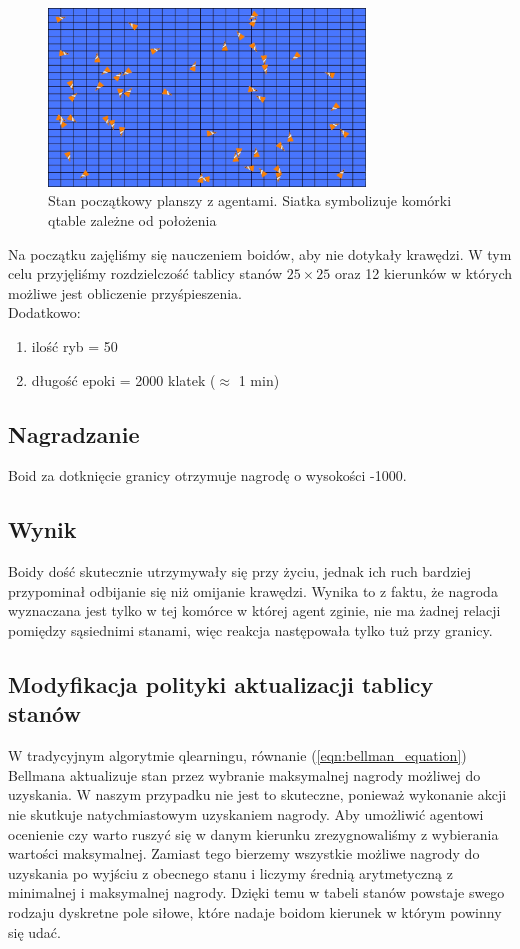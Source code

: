 \documentclass{article}
\begin{document}
\begin{figure}[H]
    \centering
    \includegraphics[width=0.75\textwidth]{1_Qtable_init.jpg}
    \caption[]{Stan początkowy planszy z agentami. Siatka symbolizuje komórki qtable zależne od położenia}
\end{figure}
Na początku zajęliśmy się nauczeniem boidów, aby nie dotykały krawędzi. W tym celu przyjęliśmy rozdzielczość tablicy stanów \(25\times25\) oraz 12 kierunków w których możliwe jest obliczenie przyśpieszenia.\\
Dodatkowo:
\begin{enumerate}
    \item ilość ryb = 50
    \item długość epoki = 2000 klatek (\(\approx\) 1 min)
\end{enumerate}
\subsection{Nagradzanie}
Boid za dotknięcie granicy otrzymuje nagrodę o wysokości -1000.
\subsection{Wynik}
Boidy dość skutecznie utrzymywały się przy życiu, jednak ich ruch bardziej przypominał odbijanie się niż omijanie krawędzi. Wynika to z faktu, że nagroda wyznaczana jest tylko w tej komórce w której agent zginie, nie ma żadnej relacji pomiędzy sąsiednimi stanami, więc reakcja następowała tylko tuż przy granicy.
\subsection{Modyfikacja polityki aktualizacji tablicy stanów}
\label{sec:politics_modification}
W tradycyjnym algorytmie qlearningu, równanie (\ref{eqn:bellman_equation}) Bellmana aktualizuje stan przez wybranie maksymalnej nagrody możliwej do uzyskania. W naszym przypadku nie jest to skuteczne, ponieważ wykonanie akcji nie skutkuje natychmiastowym uzyskaniem nagrody. Aby umożliwić agentowi ocenienie czy warto ruszyć się w danym kierunku zrezygnowaliśmy z wybierania wartości maksymalnej. Zamiast tego bierzemy wszystkie możliwe nagrody do uzyskania po wyjściu z obecnego stanu i liczymy średnią arytmetyczną z minimalnej i maksymalnej nagrody. Dzięki temu w tabeli stanów powstaje swego rodzaju dyskretne pole siłowe, które nadaje boidom kierunek w którym powinny się udać.
\end{document}

